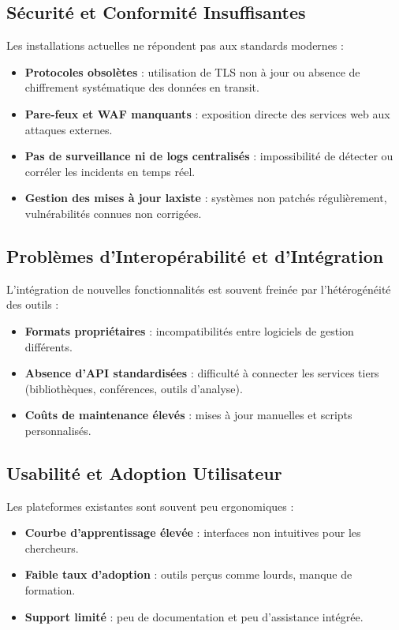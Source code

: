 \documentclass[12pt]{rapportPfe}
\begin{document}
\subsection*{Sécurité et Conformité Insuffisantes}
Les installations actuelles ne répondent pas aux standards modernes :
\begin{itemize}[itemsep=1em]
  \item \textbf{Protocoles obsolètes} : utilisation de TLS non à jour ou absence de chiffrement systématique des données en transit.
  \item \textbf{Pare-feux et WAF manquants} : exposition directe des services web aux attaques externes.
  \item \textbf{Pas de surveillance ni de logs centralisés} : impossibilité de détecter ou corréler les incidents en temps réel.
  \item \textbf{Gestion des mises à jour laxiste} : systèmes non patchés régulièrement, vulnérabilités connues non corrigées.
\end{itemize}

\subsection*{Problèmes d’Interopérabilité et d’Intégration}
L’intégration de nouvelles fonctionnalités est souvent freinée par l’hétérogénéité des outils :
\begin{itemize}[itemsep=1em]
  \item \textbf{Formats propriétaires} : incompatibilités entre logiciels de gestion différents.
  \item \textbf{Absence d’API standardisées} : difficulté à connecter les services tiers (bibliothèques, conférences, outils d’analyse).
  \item \textbf{Coûts de maintenance élevés} : mises à jour manuelles et scripts personnalisés.
\end{itemize}

\subsection*{Usabilité et Adoption Utilisateur}
Les plateformes existantes sont souvent peu ergonomiques :
\begin{itemize}[itemsep=1em]
  \item \textbf{Courbe d’apprentissage élevée} : interfaces non intuitives pour les chercheurs.
  \item \textbf{Faible taux d’adoption} : outils perçus comme lourds, manque de formation.
  \item \textbf{Support limité} : peu de documentation et peu d’assistance intégrée.
\end{itemize}
\end{document}
